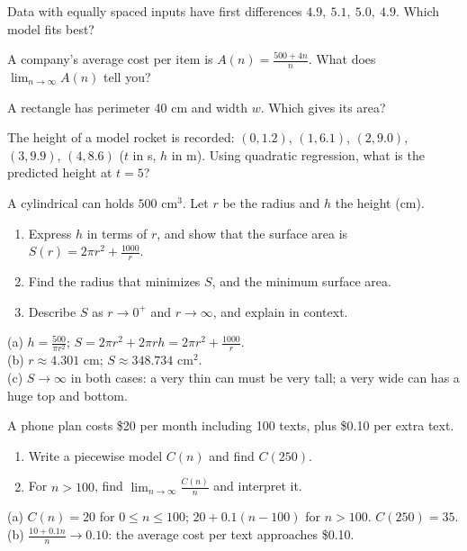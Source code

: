 \begin{exo}{}
Data with equally spaced inputs have first differences $4.9,\ 5.1,\ 5.0,\ 4.9$. Which model fits best?
\end{exo}
\begin{exo}{}
A company's average cost per item is $A(n)=\frac{500+4n}{n}$. What does $\lim_{n\to\infty}A(n)$ tell you?
\end{exo}
\begin{exo}{}
A rectangle has perimeter 40 cm and width $w$. Which gives its area?
\end{exo}
\begin{exo}{\calcreq}
The height of a model rocket is recorded: $(0,1.2)$, $(1,6.1)$, $(2,9.0)$, $(3,9.9)$, $(4,8.6)$ ($t$ in s, $h$ in m). Using quadratic regression, what is the predicted height at $t=5$?
\end{exo}
\begin{exo}{\calcreq}
A cylindrical can holds $500$ cm$^3$. Let $r$ be the radius and $h$ the height (cm).
\begin{enumerate}[label=(\alph*)]
\item Express $h$ in terms of $r$, and show that the surface area is $S(r)=2\pi r^2+\frac{1000}{r}$.
\item Find the radius that minimizes $S$, and the minimum surface area.
\item Describe $S$ as $r\to0^+$ and $r\to\infty$, and explain in context.
\end{enumerate}
\begin{solution}
(a) $h=\frac{500}{\pi r^2}$; $S=2\pi r^2+2\pi r h=2\pi r^2+\frac{1000}{r}$.\\
(b) $r\approx4.301$ cm; $S\approx348.734$ cm$^2$.\\
(c) $S\to\infty$ in both cases: a very thin can must be very tall; a very wide can has a huge top and bottom.
\end{solution}
\end{exo}
\begin{exo}{}
A phone plan costs \$20 per month including 100 texts, plus \$0.10 per extra text.
\begin{enumerate}[label=(\alph*)]
\item Write a piecewise model $C(n)$ and find $C(250)$.
\item For $n>100$, find $\lim_{n\to\infty}\frac{C(n)}{n}$ and interpret it.
\end{enumerate}
\begin{solution}
(a) $C(n)=20$ for $0\le n\le100$; $20+0.1(n-100)$ for $n>100$. $C(250)=35$.\\
(b) $\frac{10+0.1n}{n}\to0.10$: the average cost per text approaches \$0.10.
\end{solution}
\end{exo}


